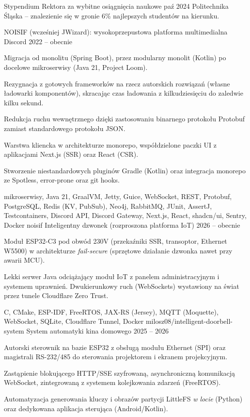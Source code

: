 
\newcommand{\AwardsTitle}{Nagrody i wyróżnienia}
\renewcommand{\AwardsList}{}
\AddAwardEntry
  {Stypendium Rektora za wybitne osiągnięcia naukowe}
  {paź 2024}
  {Politechnika Śląska -- znalezienie się w gronie 6\% najlepszych studentów na kierunku.}


\newcommand{\ProjectsTitle}{Wybrane projekty}
\renewcommand{\ProjectsList}{}
\AddProjectEntry
  {NOISIF (wcześniej JWizard): wysokoprzepustowa platforma multimedialna Discord}
  {2022 -- obecnie}
  {%
    \item
      Migracja od monolitu (Spring Boot), przez modularny monolit (Kotlin) po docelowe mikroserwisy (Java 21, Project
      Loom).
    \item
      Rezygnacja z gotowych frameworków na rzecz autorskich rozwiązań (własne ładowarki komponentów), skracając czas
      ładowania z kilkudziesięciu do zaledwie kilku sekund.
    \item
      Redukcja ruchu wewnętrznego dzięki zastosowaniu binarnego protokołu Protobuf zamiast standardowego protokołu JSON.
    \item
      Warstwa kliencka w architekturze monorepo, współdzielone paczki UI z aplikacjami Next.js (SSR) oraz React (CSR).
    \item
      Stworzenie niestandardowych pluginów Gradle (Kotlin) oraz integracja monorepo ze Spotless, error-prone oraz git hooks.
  }
  {%
    mikroserwisy, Java 21, GraalVM, Jetty, Guice, WebSocket, REST, Protobuf, PostgreSQL, Redis (KV, PubSub), Neo4j,
    RabbitMQ, JUnit, AssertJ, Testcontainers, Discord API, Discord Gateway, Next.js, React, shadcn/ui, Sentry, Docker
  }
  {noisif}
\AddProjectEntry
  {Inteligentny dzwonek (rozproszona platforma IoT)}
  {2026 -- obecnie}
  {%
    \item
      Moduł ESP32-C3 pod obwód 230V (przekaźniki SSR, transoptor, Ethernet W5500) w architekturze \textit{fail-secure}
      (sprzętowe działanie dzwonka nawet przy awarii MCU).
    \item
      Lekki serwer Java odciążający moduł IoT z panelem administracyjnym i systemem uprawnień. Dwukierunkowy ruch
      (WebSockets) wystawiony na świat przez tunele Cloudflare Zero Trust.
  }
  {C, CMake, ESP-IDF, FreeRTOS, JAX-RS (Jersey), MQTT (Moquette), WebSocket, SQLite, Cloudflare Tunnel, Docker}
  {milosz08/intelligent-doorbell-system}
\AddProjectEntry
  {System automatyki kina domowego}
  {2025 -- 2026}
  {%
    \item
      Autorski sterownik na bazie ESP32 z obsługą modułu Ethernet (SPI) oraz magistrali RS-232/485 do sterowania
      projektorem i ekranem projekcyjnym.
    \item
      Zastąpienie blokującego HTTP/SSE szyfrowaną, asynchroniczną komunikacją WebSocket, zintegrowaną z systemem
      kolejkowania zdarzeń (FreeRTOS).
    \item
      Automatyzacja generowania kluczy i obrazów partycji LittleFS \textit{w locie} (Python) oraz dedykowana aplikacja
      sterująca (Android/Kotlin).
  }
